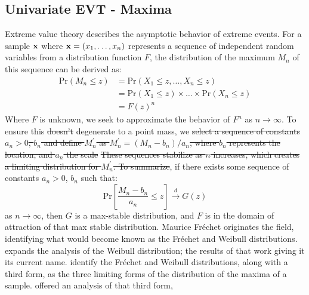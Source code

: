 \subsection{Univariate EVT - Maxima}
Extreme value theory describes the asymptotic behavior of extreme events.   For a sample ${\bf x}$
  where ${\bf x} = (x_1,\ldots,x_n)$ represents a sequence of independent random variables from a
  distribution function $F$, the distribution of the maximum $M_n$ of this sequence can be derived
  as:
  \begin{equation*}
    \begin{aligned}
      \text{Pr}(M_n\leq z) &= \text{Pr}(X_1 \leq z, \ldots, X_n \leq z)\\
        &= \text{Pr}(X_1\leq z)\times\ldots\times\text{Pr}(X_n\leq z)\\
        &= F(z)^n
    \end{aligned}
  \end{equation*}
  Where $F$ is unknown, we seek to approximate the behavior of $F^n$ as $n\rightarrow\infty$.  To
  ensure this \st{doesn't}  degenerate to a point mass, we \st{select a sequence of constants $a_n > 0$,
  $b_n$ and define $M_n^{\prime}$ as $M_n^{\prime} = (M_n - b_n)/a_n$, where $b_n$ represents the
  location, and $a_n$ the scale}  \st{These sequences stabilize as $n$ increases, which creates a
  limiting distribution for $M_n^{\prime}$. To summarize},  if there exists some sequence of
  constants $a_n > 0$, $b_n$ such that:
  \begin{equation*}
    \text{Pr}\left[\frac{M_n - b_n}{a_n} \leq z\right] \stackrel{d}{\rightarrow} G(z)
  \end{equation*}
  as $n\rightarrow\infty$, then $G$ is a max-stable distribution, and $F$ is in the domain of
  attraction of that max stable distribution.  Maurice Fr{\'e}chet \citep{frechet1927} originates the
  field, identifying what would become known as the Fr{\'e}chet and Weibull distributions.  
  \cite{weibull1951} expands the analysis of the Weibull distribution; the results
  of that work giving it its current name.  \cite{fisher1928} identify the Fr{\'e}chet
  and Weibull distributions, along with a third form, as the three limiting forms of the distribution
  of the maxima of a sample.  \cite{gumbel1935} offered an analysis of that third form,
